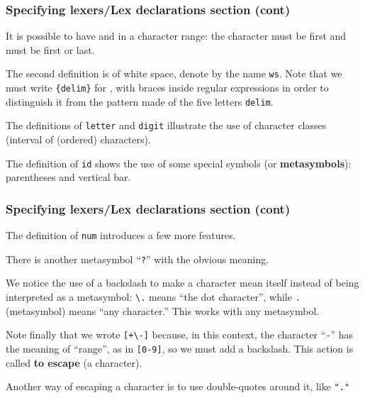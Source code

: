 %
\begin{frame}[containsverbatim]
\frametitle{Specifying lexers/Lex declarations section
(cont)}

It is possible to have \exc{]} and \exc{-} in a character range: the
character \exc{]} must be first and \exc{-} must be first or last.

\bigskip

The second definition is of white space, denote by the name
\texttt{ws}. Note that we must write \verb+{delim}+ for ,
with braces inside regular expressions in order to distinguish it from
the pattern made of the five letters \verb+delim+.

\bigskip

The definitions of \texttt{letter} and \texttt{digit} illustrate the
use of character classes (interval of (ordered) characters).

\bigskip

The definition of \texttt{id} shows the use of some \Lex special
symbols (or \textbf{metasymbols}): parentheses and vertical bar.

\end{frame}

%
\begin{frame}[containsverbatim]
\frametitle{Specifying lexers/Lex declarations section
(cont)}

The definition of \texttt{num} introduces a few more features.

\bigskip

There is another metasymbol ``\verb+?+'' with the obvious meaning.

\bigskip

We notice the use of a backslash to make a character mean itself
instead of being interpreted as a metasymbol: \verb+\.+ means ``the dot
character'', while \verb+.+ (metasymbol) means ``any character.'' This
works with any metasymbol.

\bigskip

Note finally that we wrote \verb|[+\-]| because, in this context, the
character ``\verb|-|'' has the meaning of ``range'', as in \verb+[0-9]+,
so we must add a backslash. This action is called \textbf{to
escape} (a character).

\bigskip

Another way of escaping a character is to use double-quotes around it,
like \verb+"."+

\end{frame}

